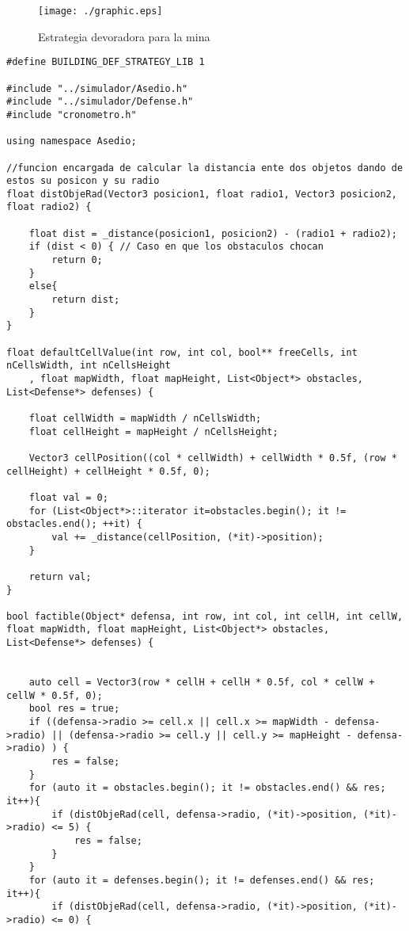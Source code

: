 \begin{figure}
\centering
\texttt{[image: ./graphic.eps]} %
\caption{Estrategia devoradora para la mina}
\label{fig:Grafica}
\end{figure}

\begin{lstlisting}
#define BUILDING_DEF_STRATEGY_LIB 1

#include "../simulador/Asedio.h"
#include "../simulador/Defense.h"
#include "cronometro.h"

using namespace Asedio;     

//funcion encargada de calcular la distancia ente dos objetos dando de estos su posicon y su radio
float distObjeRad(Vector3 posicion1, float radio1, Vector3 posicion2, float radio2) {

    float dist = _distance(posicion1, posicion2) - (radio1 + radio2);
    if (dist < 0) { // Caso en que los obstaculos chocan
        return 0; 
    }
    else{
        return dist;
    }
}

float defaultCellValue(int row, int col, bool** freeCells, int nCellsWidth, int nCellsHeight               
    , float mapWidth, float mapHeight, List<Object*> obstacles, List<Defense*> defenses) {
    	
    float cellWidth = mapWidth / nCellsWidth;
    float cellHeight = mapHeight / nCellsHeight;

    Vector3 cellPosition((col * cellWidth) + cellWidth * 0.5f, (row * cellHeight) + cellHeight * 0.5f, 0);
    	
    float val = 0;
    for (List<Object*>::iterator it=obstacles.begin(); it != obstacles.end(); ++it) {
	    val += _distance(cellPosition, (*it)->position);
    }

    return val;
}

bool factible(Object* defensa, int row, int col, int cellH, int cellW, float mapWidth, float mapHeight, List<Object*> obstacles, List<Defense*> defenses) {
    
    
    auto cell = Vector3(row * cellH + cellH * 0.5f, col * cellW + cellW * 0.5f, 0);
    bool res = true;
    if ((defensa->radio >= cell.x || cell.x >= mapWidth - defensa->radio) || (defensa->radio >= cell.y || cell.y >= mapHeight - defensa->radio) ) {
        res = false;
    }
    for (auto it = obstacles.begin(); it != obstacles.end() && res; it++){
        if (distObjeRad(cell, defensa->radio, (*it)->position, (*it)->radio) <= 5) {
            res = false;
        }
    }
    for (auto it = defenses.begin(); it != defenses.end() && res; it++){
        if (distObjeRad(cell, defensa->radio, (*it)->position, (*it)->radio) <= 0) {
            

\end{lstlisting}
